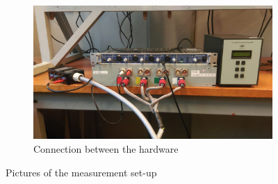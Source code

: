 \begin{figure}[h!]
\begin{subfigure}[b]{0.5\textwidth}
        \end{subfigure}~
        \begin{subfigure}[b]{0.5\textwidth}
			    \centering
    			\includegraphics[width=\textwidth]{afbeeldingen/hardware.jpg}
    			\caption{Connection between the hardware}
			    \label{fig:hardware}
                
        \end{subfigure}
        
        \caption[Measurement set-up overview]{Pictures of the measurement set-up}
        \label{fig:app:overview}
\end{figure}